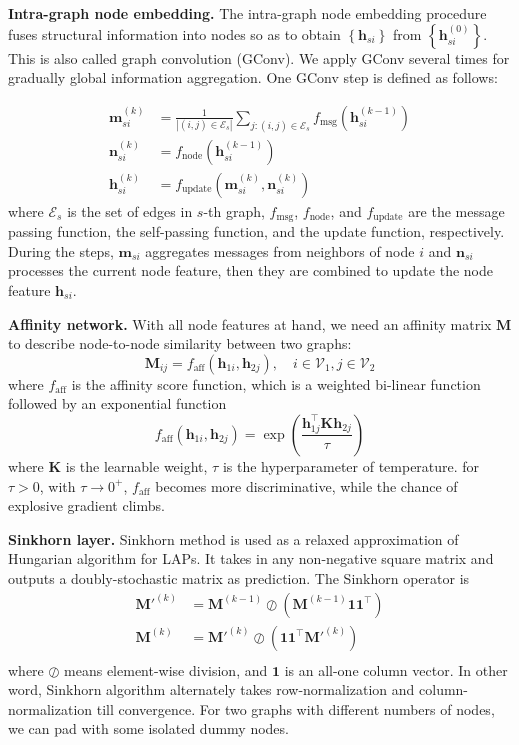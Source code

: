 \documentclass[a4paper]{article}
\newcommand{\set}[1]{\left\{#1\right\}}
\begin{document}
\textbf{Intra-graph node embedding.}
The intra-graph node embedding procedure fuses structural information into nodes so as to obtain $\set{\mathbf{h}_{si}}$ from $\set{\mathbf{h}_{si}^{(0)}}$. This is also called graph convolution (GConv). We apply GConv several times for gradually global information aggregation. One GConv step is defined as follows:

\begin{align}
    \mathbf{m}_{si}^{(k)} &= \frac{1}{\left|(i,j) \in \mathcal{E}_s\right|} \sum_{j: (i,j) \in \mathcal{E}_s} f_{\mathrm{msg}}\left(\mathbf{h}_{si}^{(k-1)}\right)\\
    \mathbf{n}_{si}^{(k)} &= f_{\mathrm{node}}\left( \mathbf{h}_{si}^{(k-1)} \right)\\
    \mathbf{h}_{si}^{(k)} &= f_{\mathrm{update}}\left( \mathbf{m}_{si}^{(k)}, \mathbf{n}_{si}^{(k)} \right)
\end{align}
where $\mathcal{E}_s$ is the set of edges in $s$-th graph, $f_{\mathrm{msg}}$, $f_{\mathrm{node}}$, and $f_{\mathrm{update}}$ are the message passing function, the self-passing function, and the update function, respectively. 
During the steps, $\mathbf{m}_{si}$ aggregates messages from neighbors of node $i$ and $\mathbf{n}_{si}$ processes the current node feature, then they are combined to update the node feature $\mathbf{h}_{si}$. 

\textbf{Affinity network.}
With all node features at hand, we need an affinity matrix $\mathbf{M}$ to describe node-to-node similarity between two graphs:
$$
\mathbf{M}_{ij} = f_{\mathrm{aff}}\left(\mathbf{h}_{1i}, \mathbf{h}_{2j}\right), \quad i\in \mathcal{V}_1, j\in \mathcal{V}_2
$$
where $f_{\mathrm{aff}}$ is the affinity score function, which is a weighted bi-linear function followed by an exponential function 
$$
f_{\mathrm{aff}}\left(\mathbf{h}_{1i}, \mathbf{h}_{2j} \right) = \exp\left(\frac{ \mathbf{h}_{1j}^\top \mathbf{K}  \mathbf{h}_{2j}}{\tau}\right)
$$
where $\mathbf{K}$ is the learnable weight, $\tau$ is the hyperparameter of temperature. for $\tau > 0$, with $\tau \rightarrow 0^+$, $f_{\mathrm{aff}}$ becomes more discriminative, while the chance of explosive gradient climbs.

\textbf{Sinkhorn layer.}
Sinkhorn \cite{sinkhorn} method is used as a relaxed approximation of Hungarian algorithm \cite{hungarian} for LAPs. It takes in any non-negative square matrix and outputs a doubly-stochastic matrix as prediction. The Sinkhorn operator is
\begin{align}
    \mathbf{M}'^{(k)} &=\mathbf{M}^{(k-1)} \oslash \left(\mathbf{M}^{(k-1)}\mathbf{1}\mathbf{1}^\top\right)\\
    \mathbf{M}^{(k)} &=\mathbf{M}'^{(k)} \oslash \left(\mathbf{1}\mathbf{1}^\top\mathbf{M}'^{(k)}\right)\\
\end{align}
where $\oslash$ means element-wise division, and $\mathbf{1}$ is an all-one column vector. In other word, Sinkhorn algorithm alternately takes row-normalization and column-normalization till convergence. For two graphs with different numbers of nodes, we can pad with some isolated dummy nodes.
\end{document}
